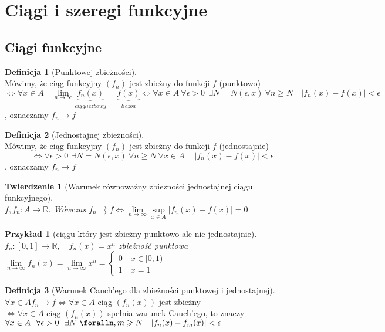 \documentclass[12pt,a4paper]{article}
\newtheorem{tw}{Twierdzenie}
\newtheorem{przyklad}{Przykład}
\theoremstyle{definition}
\newtheorem{df}{Definicja}
\begin{document}




\section{Ciągi i szeregi funkcyjne}
\subsection{Ciągi funkcyjne}
\begin{df}[Punktowej zbieżności]~\\
Mówimy, że ciąg funkcyjny $(f_n)$ jest zbieżny do funkcji $f$ (punktowo)
 $$\Leftrightarrow \forall x\in A \quad \lim\limits_{n\to\infty}\underbrace{f_n(x)}_{ciąg liczbowy} = \underbrace{f(x)}_{liczba} \Leftrightarrow \forall x\in A ~ \forall\epsilon > 0 ~~ \exists N = N(\epsilon, x) ~ \forall n \geqslant N \quad |f_n(x)-f(x)| < \epsilon$$, oznaczamy $f_n \rightarrow f$
\end{df}

\begin{df}[Jednostajnej zbieżności]~\\
Mówimy, że ciąg funkcyjny $(f_n)$ jest zbieżny do funkcji $f$ (jednostajnie) $$\Leftrightarrow \forall\epsilon > 0 ~~ \exists N = N(\epsilon, x) ~ \forall n \geqslant N ~ \forall x\in A ~ \quad |f_n(x)-f(x)| < \epsilon$$, oznaczamy $f_n \rightarrow f$
\end{df}

\begin{tw}[Warunek równoważny zbiezności jednostajnej ciągu funkcyjnego]~\\
$f, f_n: A \to \mathbb{R}$. Wówczas $f_n \rightrightarrows f \Leftrightarrow \lim\limits_{n\to\infty} \sup\limits_{x\in A} |f_n(x)-f(x)| = 0$
\end{tw}

\begin{przyklad}[ciągu który jest zbieżny punktowo ale nie jednostajnie]
$f_n: [0,1] \to \mathbb{R}, \quad f_n(x) = x^n$ zbieżność punktowa
$
	\lim\limits_{n\to\infty}f_n(x) = \lim\limits_{n\to\infty}x^n = 
	\begin{cases}
	0 \quad x\in[0,1)\\
	1 \quad x=1
	\end{cases}
$
\end{przyklad}

\begin{df}[Warunek Cauch'ego dla zbieżności punktowej i jednostajnej]~\\
$\forall x\in A f_n \rightarrow f \Leftrightarrow \forall x\in A$ ciąg $(f_n(x))$ jest zbieżny $\Leftrightarrow \forall x\in A \mbox{ ciąg } (f_n(x))$ spełnia warunek Cauch'ego, to znaczy 
$\forall x\in A ~~ \forall \epsilon>0 ~~ \exists N ~ \foralln,m \geqslant N \quad |f_n(x) - f_m(x)| < \epsilon$ 
\end{df}
\end{document}
